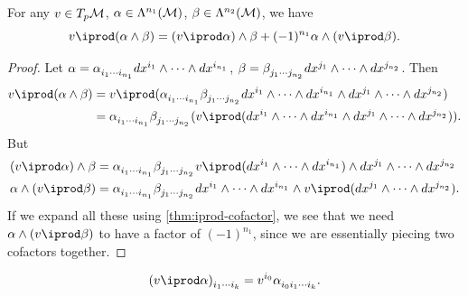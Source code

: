 \documentclass[../main.tex]{subfiles}
\begin{document}
    \begin{corollary}\label{cor:iprod-exterior-product}
        For any \(v \in T_p\manifold[M]\), \(\alpha \in \form{n_1}{M}\), \(\beta \in 
        \form{n_2}{M}\), we have 
        \[
        v\iprod (\alpha\wedge \beta)=(v\iprod \alpha)\wedge \beta + (-1)^{n_1}
        \alpha\wedge(v\iprod\beta).
        \]
    \end{corollary}
    \begin{proof}
        Let \(\alpha = \alpha\indices{_{i_1}_\cdots_{i_{n_1}}}dx^{i_1}\wedge\dots
        \wedge dx^{i_{n_1}}\), 
        \(\beta = \beta\indices{_{j_1}_\cdots_{j_{n_2}}}dx^{j_1}\wedge\dots
        \wedge dx^{j_{n_2}}\). Then 
        \[
        \begin{aligned}
            v\iprod (\alpha \wedge \beta)
            &=v\iprod(\alpha\indices{_{i_1}_\cdots_{i_{n_1}}}
            \beta\indices{_{j_1}_\cdots_{j_{n_2}}}
            dx^{i_1}\wedge\dots\wedge dx^{i_{n_1}}\wedge dx^{j_1}\wedge\dots
            \wedge dx^{j_{n_2}})\\
            &=\alpha\indices{_{i_1}_\cdots_{i_{n_1}}}
            \beta\indices{_{j_1}_\cdots_{j_{n_2}}}(v\iprod(dx^{i_1}\wedge\dots\wedge
            dx^{i_{n_1}}\wedge dx^{j_1}\wedge\dots\wedge dx^{j_{n_2}})).
        \end{aligned}
        \]
        But 
        \[
        \begin{aligned}
            &(v\iprod \alpha)\wedge \beta = \alpha\indices{_{i_1}_\cdots_{i_{n_1}}}
            \beta\indices{_{j_1}_\cdots_{j_{n_2}}}
            v\iprod(dx^{i_1}\wedge\dots\wedge dx^{i_{n_1}})\wedge 
            dx^{j_1}\wedge\dots\wedge dx^{j_{n_2}} \\
            &\alpha\wedge(v\iprod\beta) = \alpha\indices{_{i_1}_\cdots_{i_{n_1}}}
            \beta\indices{_{j_1}_\cdots_{j_{n_2}}}
            dx^{i_1}\wedge\dots\wedge dx^{i_{n_1}}\wedge
            v\iprod(dx^{j_1}\wedge\dots\wedge dx^{j_{n_2}}).
        \end{aligned}
        \]
        If we expand all these using \cref{thm:iprod-cofactor}, we see that 
        we need \(\alpha\wedge(v\iprod\beta)\) to have a factor of \((-1)^{n_1}\), 
        since we are essentially piecing two cofactors together.
    \end{proof}
    \begin{corollary}\label{cor:iprod-coordinate}
        \[
        (v\iprod\alpha)\indices{_{i_1}_\cdots_{i_k}} = 
        v^{i_0}\alpha\indices{_{i_0}_{i_1}_\cdots_{i_k}}.
        \]
    \end{corollary}
\end{document}
